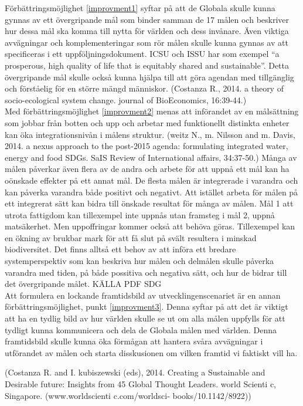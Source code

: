 \documentclass{report}
\begin{document}
Förbättringsmöjlighet \ref{improvment1} syftar på att de Globala skulle kunna gynnas av ett övergripande mål som binder samman de 17 målen och beskriver hur dessa mål ska komma till nytta för världen och dess invånare. Även viktiga avvägningar och komplementeringar som rör målen skulle kunna gynnas av att specificeras i ett uppföljningsdokument. ICSU och ISSU har som exempel “a prosperous, high quality of life that is equitably shared and sustainable”. Detta övergripande mål skulle också kunna hjälpa till att göra agendan med tillgänglig och förståelig för en större mängd människor. (Costanza R., 2014. a theory of socio-ecological system change. journal of BioEconomics, 16:39-44.)\\

Med förbättringsmöjlighet \ref{improvment2} menas att införandet av en målsättning som jobbar från botten och upp och arbetar med funktionellt distinkta enheter kan öka integrationsnivån i målens struktur. (weitz N., m. Nilsson and m. Davis, 2014. a nexus approach to the post-2015 agenda: formulating integrated water, energy and food SDGs. SaIS Review of International affairs, 34:37-50.)
Många av målen påverkar även flera av de andra och arbete för att uppnå ett mål kan ha oönskade effekter på ett annat mål. De flesta målen är integrerade i varandra och kan påverka varandra både positivt och negativt. Att istället arbeta för målen på ett integrerat sätt kan bidra till önskade resultat för många av målen. Mål 1 att utrota fattigdom kan tillexempel inte uppnås utan framsteg i mål 2, uppnå matsäkerhet. Men uppoffringar kommer också att behöva göras. Tillexempel kan en ökning av brukbar mark för att få slut på svält resultera i minskad biodiversitet. Det finns alltså ett behov av att införa ett bredare systemperspektiv som kan beskriva hur målen och delmålen skulle påverka varandra med tiden, på både possitiva och negativa sätt, och hur de bidrar till det övergripande målet. KÄLLA PDF SDG\\

Att formulera en lockande framtidsbild av utvecklingenscenariet är en annan förbättringsmöjlighet, punkt \ref{improvment3}. Denna syftar på att det är viktigt att ha en tydlig bild av hur världen skulle se ut om alla målen uppfylls för att tydligt kunna kommunicera och dela de Globala målen med världen. Denna framtidsbild skulle kunna öka förmågan att hantera svåra avvägningar i utförandet av målen och starta disskusionen om vilken framtid vi faktiskt vill ha. 

(Costanza R. and I. kubiszewski (eds), 2014. Creating a Sustainable and Desirable future: Insights from 45 Global Thought Leaders. world Scienti c, Singapore. (www.worldscienti c.com/worldsci- books/10.1142/8922))\\
\end{document}
